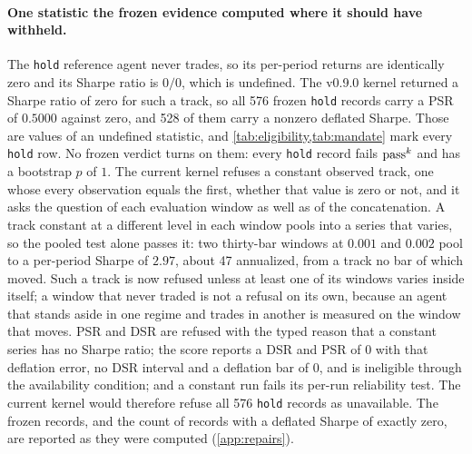 \paragraph{One statistic the frozen evidence computed where it should have withheld.} The \texttt{hold} reference agent never trades, so its per-period returns are identically zero and its Sharpe ratio is $0/0$, which is undefined. The v0.9.0 kernel returned a Sharpe ratio of zero for such a track, so all 576 frozen \texttt{hold} records carry a PSR of $0.5000$ against zero, and 528 of them carry a nonzero deflated Sharpe. Those are values of an undefined statistic, and \cref{tab:eligibility,tab:mandate} mark every \texttt{hold} row. No frozen verdict turns on them: every \texttt{hold} record fails $\text{pass}^{k}$ and has a bootstrap $p$ of $1$. The current kernel refuses a constant observed track, one whose every observation equals the first, whether that value is zero or not, and it asks the question of each evaluation window as well as of the concatenation. A track constant at a different level in each window pools into a series that varies, so the pooled test alone passes it: two thirty-bar windows at $0.001$ and $0.002$ pool to a per-period Sharpe of $2.97$, about 47 annualized, from a track no bar of which moved. Such a track is now refused unless at least one of its windows varies inside itself; a window that never traded is not a refusal on its own, because an agent that stands aside in one regime and trades in another is measured on the window that moves. PSR and DSR are refused with the typed reason that a constant series has no Sharpe ratio; the score reports a DSR and PSR of $0$ with that deflation error, no DSR interval and a deflation bar of $0$, and is ineligible through the availability condition; and a constant run fails its per-run reliability test. The current kernel would therefore refuse all 576 \texttt{hold} records as unavailable. The frozen records, and the count of records with a deflated Sharpe of exactly zero, are reported as they were computed (\cref{app:repairs}).

